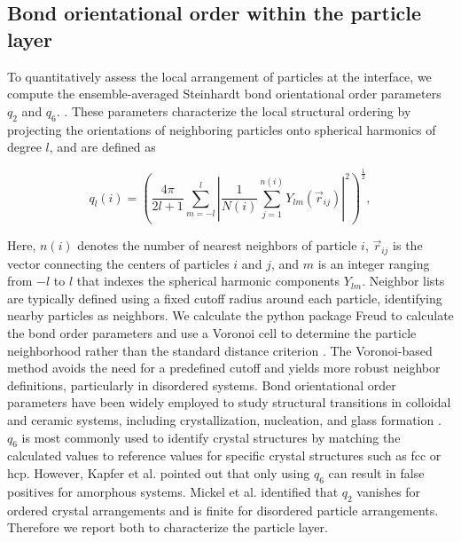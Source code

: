 \subsection{Bond orientational order within the particle layer}

To quantitatively assess the local arrangement of particles at the interface, we compute the ensemble-averaged Steinhardt bond orientational order parameters $q_2$ and $q_6$.
\cite{steinhardt_bond-orientational_1983, lechner_accurate_2008, mickel_shortcomings_2013}. These parameters characterize the local structural ordering by projecting the orientations of neighboring particles 
onto spherical harmonics of degree \(l\), and are defined as


\begin{equation}
q_l(i) = \left( \frac{4\pi}{2l+1} \sum_{m=-l}^{l} \left| \frac{1}{N(i)} \sum_{j=1}^{n(i)} Y_{lm}(\vec{r}_{ij}) \right|^2 \right)^{\frac{1}{2}} ,
\label{eq:steinhardt_definition}
\end{equation} 

Here, \(n(i)\) denotes the number of nearest neighbors of particle \(i\), \(\vec{r}_{ij}\) is the vector connecting the centers of particles \(i\) and \(j\), and \(m\) is an integer ranging from \(-l\) 
to \(l\) that indexes the spherical harmonic components \(Y_{lm}\). Neighbor lists are typically defined using a fixed cutoff radius around each particle, identifying nearby particles as neighbors. 
We calculate the python package Freud to calculate the bond order parameters and use a Voronoi cell to determine the particle neighborhood rather than the standard distance criterion 
\cite{ramasubramani_freud_2020,mickel_shortcomings_2013}. The Voronoi-based method avoids the need for a predefined cutoff and yields more robust neighbor definitions, particularly in disordered systems. 
Bond orientational order parameters have been widely employed to study structural transitions in colloidal and ceramic systems, including crystallization, nucleation, and glass formation 
\cite{vagberg_glassiness_2011, besseling_three-dimensional_2007, schall_structural_2007, ozawa_jamming_2012}. $q_6$ is most commonly used to identify crystal structures by matching the calculated
values to reference values for specific crystal structures such as fcc or hcp. However, Kapfer et al. pointed out that only using $q_6$ can result in false positives for amorphous systems. \cite{kapfer_jammed_2012}
Mickel et al. identified that $q_2$ vanishes for ordered crystal arrangements and is finite for disordered particle arrangements. \cite{mickel_shortcomings_2013} Therefore we report both to
characterize the particle layer. 

